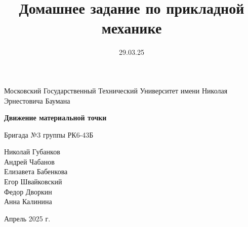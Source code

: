 \documentclass[12pt]{article} %
\title{Домашнее задание по прикладной механике}
\date{29.03.25}
\begin{document}
\begin{titlepage}
    \centering
    \vspace{0.8cm}
    \Large
    Московский Государственный Технический Университет имени Николая Эрнестовича Баумана\\

    \vspace*{3cm}

    \Huge
    \textbf{Движение материальной точки}

    \vspace{0.5cm}
    \LARGE
    Бригада №3 группы РК6-43Б

    \vspace{2.5cm}
    \large
    Николай Губанков\\
    Андрей Чабанов\\
    Елизавета Бабенкова\\
    Егор Швайковский\\
    Федор Дворкин\\
    Анна Калинина

    \vfill
    Апрель 2025 г.
\end{titlepage}

\clearpage

\tableofcontents
\clearpage


\clearpage

\clearpage
\end{document}
